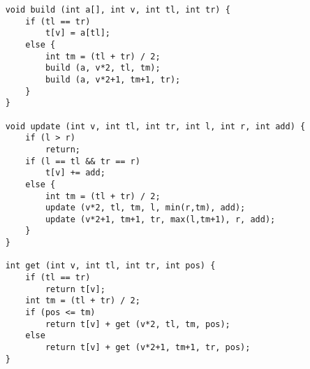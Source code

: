 \documentclass{article}
\begin{document}
\begin{verbatim}
    void build (int a[], int v, int tl, int tr) {
        if (tl == tr)
            t[v] = a[tl];
        else {
            int tm = (tl + tr) / 2;
            build (a, v*2, tl, tm);
            build (a, v*2+1, tm+1, tr);
        }
    }
     
    void update (int v, int tl, int tr, int l, int r, int add) {
        if (l > r)
            return;
        if (l == tl && tr == r)
            t[v] += add;
        else {
            int tm = (tl + tr) / 2;
            update (v*2, tl, tm, l, min(r,tm), add);
            update (v*2+1, tm+1, tr, max(l,tm+1), r, add);
        }
    }
     
    int get (int v, int tl, int tr, int pos) {
        if (tl == tr)
            return t[v];
        int tm = (tl + tr) / 2;
        if (pos <= tm)
            return t[v] + get (v*2, tl, tm, pos);
        else
            return t[v] + get (v*2+1, tm+1, tr, pos);
    }
\end{verbatim}
\end{document}
